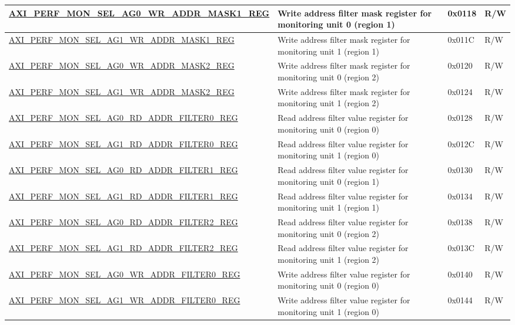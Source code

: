 \begin{longtable}{ | p{9.1cm} | p{5cm} | p{1.3cm} | p{1.4cm} | }
\hyperref[regdesc:AXIPERFMONSELAGNWRADDRMASKMREG]{AXI\_PERF\_MON\_SEL\_AG0\_WR\_ADDR\_MASK1\_REG} & Write address filter mask register for monitoring unit 0 (region 1) & 0x0118 & R/W\\ \hline
\hyperref[regdesc:AXIPERFMONSELAGNWRADDRMASKMREG]{AXI\_PERF\_MON\_SEL\_AG1\_WR\_ADDR\_MASK1\_REG} & Write address filter mask register for monitoring unit 1 (region 1) & 0x011C & R/W\\ \hline
\hyperref[regdesc:AXIPERFMONSELAGNWRADDRMASKMREG]{AXI\_PERF\_MON\_SEL\_AG0\_WR\_ADDR\_MASK2\_REG} & Write address filter mask register for monitoring unit 0 (region 2) & 0x0120 & R/W\\ \hline
\hyperref[regdesc:AXIPERFMONSELAGNWRADDRMASKMREG]{AXI\_PERF\_MON\_SEL\_AG1\_WR\_ADDR\_MASK2\_REG} & Write address filter mask register for monitoring unit 1 (region 2) & 0x0124 & R/W\\ \hline
\hyperref[regdesc:AXIPERFMONSELAGNRDADDRFILTERMREG]{AXI\_PERF\_MON\_SEL\_AG0\_RD\_ADDR\_FILTER0\_REG} & Read address filter value register for monitoring unit 0 (region 0) & 0x0128 & R/W\\ \hline
\hyperref[regdesc:AXIPERFMONSELAGNRDADDRFILTERMREG]{AXI\_PERF\_MON\_SEL\_AG1\_RD\_ADDR\_FILTER0\_REG} & Read address filter value register for monitoring unit 1 (region 0) & 0x012C & R/W\\ \hline
\hyperref[regdesc:AXIPERFMONSELAGNRDADDRFILTERMREG]{AXI\_PERF\_MON\_SEL\_AG0\_RD\_ADDR\_FILTER1\_REG} & Read address filter value register for monitoring unit 0 (region 1) & 0x0130 & R/W\\ \hline
\hyperref[regdesc:AXIPERFMONSELAGNRDADDRFILTERMREG]{AXI\_PERF\_MON\_SEL\_AG1\_RD\_ADDR\_FILTER1\_REG} & Read address filter value register for monitoring unit 1 (region 1) & 0x0134 & R/W\\ \hline
\hyperref[regdesc:AXIPERFMONSELAGNRDADDRFILTERMREG]{AXI\_PERF\_MON\_SEL\_AG0\_RD\_ADDR\_FILTER2\_REG} & Read address filter value register for monitoring unit 0 (region 2) & 0x0138 & R/W\\ \hline
\hyperref[regdesc:AXIPERFMONSELAGNRDADDRFILTERMREG]{AXI\_PERF\_MON\_SEL\_AG1\_RD\_ADDR\_FILTER2\_REG} & Read address filter value register for monitoring unit 1 (region 2) & 0x013C & R/W\\ \hline
\hyperref[regdesc:AXIPERFMONSELAGNWRADDRFILTERMREG]{AXI\_PERF\_MON\_SEL\_AG0\_WR\_ADDR\_FILTER0\_REG} & Write address filter value register for monitoring unit 0 (region 0) & 0x0140 & R/W\\ \hline
\hyperref[regdesc:AXIPERFMONSELAGNWRADDRFILTERMREG]{AXI\_PERF\_MON\_SEL\_AG1\_WR\_ADDR\_FILTER0\_REG} & Write address filter value register for monitoring unit 1 (region 0) & 0x0144 & R/W\\ \hline

\end{longtable}
